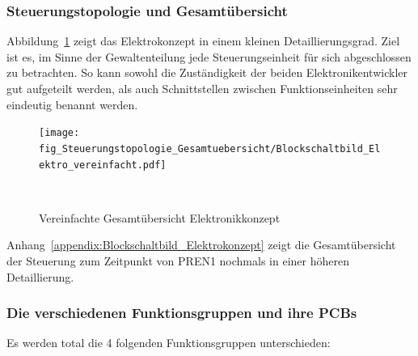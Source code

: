 \documentclass[main.tex]{subfiles} %
\begin{document}

\subsubsection{Steuerungstopologie und Gesamtübersicht}

Abbildung~\ref{fig:Gesamtuebersicht_vereinfacht} zeigt das Elektrokonzept in
einem kleinen Detaillierungsgrad. Ziel ist es, im Sinne der Gewaltenteilung
jede Steuerungseinheit für sich abgeschlossen zu betrachten. So kann sowohl die
Zuständigkeit der beiden Elektronikentwickler gut aufgeteilt werden, als auch
Schnittstellen zwischen Funktionseinheiten sehr eindeutig benannt werden.

\begin{figure}[H]
      \centering
      \texttt{[image: fig\_Steuerungstopologie\_Gesamtuebersicht/Blockschaltbild\_Elektro\_vereinfacht.pdf]}
      \caption{Vereinfachte Gesamtübersicht Elektronikkonzept}~\label{fig:Gesamtuebersicht_vereinfacht}
\end{figure}

Anhang~\ref{appendix:Blockschaltbild_Elektrokonzept} zeigt die Gesamtübersicht
der Steuerung zum Zeitpunkt von PREN1 nochmals in einer höheren Detaillierung.

\subsubsection*{Die verschiedenen Funktionsgruppen und ihre PCBs}
Es werden total die 4 folgenden Funktionsgruppen unterschieden:
\end{document}
